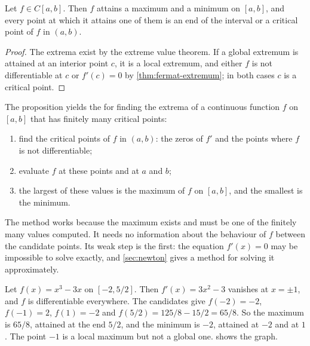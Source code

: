 \begin{proposition}
\label{prop:candidates}
Let $f\in C[a,b]$. Then $f$ attains a maximum and a minimum on $[a,b]$, and every point at which it attains one of them is an end of the interval or a critical point of $f$ in $(a,b)$.
\end{proposition}

\begin{proof}
The extrema exist by the extreme value theorem. If a global extremum is attained at an interior point $c$, it is a local extremum, and either $f$ is not differentiable at $c$ or $f'(c)=0$ by \cref{thm:fermat-extremum}; in both cases $c$ is a critical point.
\end{proof}

The proposition yields the  for finding the extrema of a continuous function $f$ on $[a,b]$ that has finitely many critical points:
\begin{enumerate}
\item find the critical points of $f$ in $(a,b)$: the zeros of $f'$ and the points where $f$ is not differentiable;
\item evaluate $f$ at these points and at $a$ and $b$;
\item the largest of these values is the maximum of $f$ on $[a,b]$, and the smallest is the minimum.
\end{enumerate}
The method works because the maximum exists and must be one of the finitely many values computed. It needs no information about the behaviour of $f$ between the candidate points. Its weak step is the first: the equation $f'(x)=0$ may be impossible to solve exactly, and \cref{sec:newton} gives a method for solving it approximately.

Let $f(x)=x^3-3x$ on $[-2,5/2]$. Then $f'(x)=3x^2-3$ vanishes at $x=\pm1$, and $f$ is differentiable everywhere. The candidates give $f(-2)=-2$, $f(-1)=2$, $f(1)=-2$ and $f(5/2)=125/8-15/2=65/8$. So the maximum is $65/8$, attained at the end $5/2$, and the minimum is $-2$, attained at $-2$ and at $1$. The point $-1$ is a local maximum but not a global one.  shows the graph.

